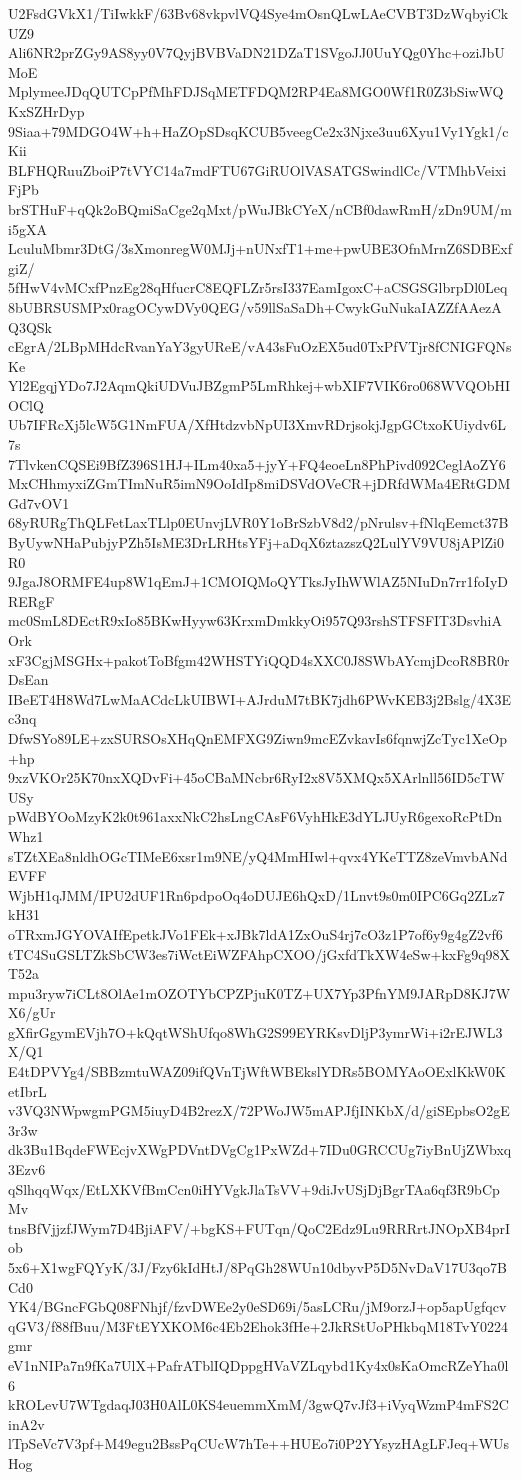 U2FsdGVkX1/TiIwkkF/63Bv68vkpvlVQ4Sye4mOsnQLwLAeCVBT3DzWqbyiCkUZ9
Ali6NR2prZGy9AS8yy0V7QyjBVBVaDN21DZaT1SVgoJJ0UuYQg0Yhc+oziJbUMoE
MplymeeJDqQUTCpPfMhFDJSqMETFDQM2RP4Ea8MGO0Wf1R0Z3bSiwWQKxSZHrDyp
9Siaa+79MDGO4W+h+HaZOpSDsqKCUB5veegCe2x3Njxe3uu6Xyu1Vy1Ygk1/cKii
BLFHQRuuZboiP7tVYC14a7mdFTU67GiRUOlVASATGSwindlCc/VTMhbVeixiFjPb
brSTHuF+qQk2oBQmiSaCge2qMxt/pWuJBkCYeX/nCBf0dawRmH/zDn9UM/mi5gXA
LculuMbmr3DtG/3sXmonregW0MJj+nUNxfT1+me+pwUBE3OfnMrnZ6SDBExfgiZ/
5fHwV4vMCxfPnzEg28qHfucrC8EQFLZr5rsI337EamIgoxC+aCSGSGlbrpDl0Leq
8bUBRSUSMPx0ragOCywDVy0QEG/v59llSaSaDh+CwykGuNukaIAZZfAAezAQ3QSk
cEgrA/2LBpMHdcRvanYaY3gyUReE/vA43sFuOzEX5ud0TxPfVTjr8fCNIGFQNsKe
Yl2EgqjYDo7J2AqmQkiUDVuJBZgmP5LmRhkej+wbXIF7VIK6ro068WVQObHIOClQ
Ub7IFRcXj5lcW5G1NmFUA/XfHtdzvbNpUI3XmvRDrjsokjJgpGCtxoKUiydv6L7s
7TlvkenCQSEi9BfZ396S1HJ+ILm40xa5+jyY+FQ4eoeLn8PhPivd092CeglAoZY6
MxCHhmyxiZGmTImNuR5imN9OoIdIp8miDSVdOVeCR+jDRfdWMa4ERtGDMGd7vOV1
68yRURgThQLFetLaxTLlp0EUnvjLVR0Y1oBrSzbV8d2/pNrulsv+fNlqEemct37B
ByUywNHaPubjyPZh5IsME3DrLRHtsYFj+aDqX6ztazszQ2LulYV9VU8jAPlZi0R0
9JgaJ8ORMFE4up8W1qEmJ+1CMOIQMoQYTksJyIhWWlAZ5NIuDn7rr1foIyDRERgF
mc0SmL8DEctR9xIo85BKwHyyw63KrxmDmkkyOi957Q93rshSTFSFIT3DsvhiAOrk
xF3CgjMSGHx+pakotToBfgm42WHSTYiQQD4sXXC0J8SWbAYcmjDcoR8BR0rDsEan
IBeET4H8Wd7LwMaACdcLkUIBWI+AJrduM7tBK7jdh6PWvKEB3j2Bslg/4X3Ec3nq
DfwSYo89LE+zxSURSOsXHqQnEMFXG9Ziwn9mcEZvkavIs6fqnwjZcTyc1XeOp+hp
9xzVKOr25K70nxXQDvFi+45oCBaMNcbr6RyI2x8V5XMQx5XArlnll56ID5cTWUSy
pWdBYOoMzyK2k0t961axxNkC2hsLngCAsF6VyhHkE3dYLJUyR6gexoRcPtDnWhz1
sTZtXEa8nldhOGcTIMeE6xsr1m9NE/yQ4MmHIwl+qvx4YKeTTZ8zeVmvbANdEVFF
WjbH1qJMM/IPU2dUF1Rn6pdpoOq4oDUJE6hQxD/1Lnvt9s0m0IPC6Gq2ZLz7kH31
oTRxmJGYOVAIfEpetkJVo1FEk+xJBk7ldA1ZxOuS4rj7cO3z1P7of6y9g4gZ2vf6
tTC4SuGSLTZkSbCW3es7iWctEiWZFAhpCXOO/jGxfdTkXW4eSw+kxFg9q98XT52a
mpu3ryw7iCLt8OlAe1mOZOTYbCPZPjuK0TZ+UX7Yp3PfnYM9JARpD8KJ7WX6/gUr
gXfirGgymEVjh7O+kQqtWShUfqo8WhG2S99EYRKsvDljP3ymrWi+i2rEJWL3X/Q1
E4tDPVYg4/SBBzmtuWAZ09ifQVnTjWftWBEkslYDRs5BOMYAoOExlKkW0KetIbrL
v3VQ3NWpwgmPGM5iuyD4B2rezX/72PWoJW5mAPJfjINKbX/d/giSEpbsO2gE3r3w
dk3Bu1BqdeFWEcjvXWgPDVntDVgCg1PxWZd+7IDu0GRCCUg7iyBnUjZWbxq3Ezv6
qSlhqqWqx/EtLXKVfBmCcn0iHYVgkJlaTsVV+9diJvUSjDjBgrTAa6qf3R9bCpMv
tnsBfVjjzfJWym7D4BjiAFV/+bgKS+FUTqn/QoC2Edz9Lu9RRRrtJNOpXB4prIob
5x6+X1wgFQYyK/3J/Fzy6kIdHtJ/8PqGh28WUn10dbyvP5D5NvDaV17U3qo7BCd0
YK4/BGncFGbQ08FNhjf/fzvDWEe2y0eSD69i/5asLCRu/jM9orzJ+op5apUgfqcv
qGV3/f88fBuu/M3FtEYXKOM6c4Eb2Ehok3fHe+2JkRStUoPHkbqM18TvY0224gmr
eV1nNIPa7n9fKa7UlX+PafrATblIQDppgHVaVZLqybd1Ky4x0sKaOmcRZeYha0l6
kROLevU7WTgdaqJ03H0AlL0KS4euemmXmM/3gwQ7vJf3+iVyqWzmP4mFS2CinA2v
lTpSeVc7V3pf+M49egu2BssPqCUcW7hTe++HUEo7i0P2YYsyzHAgLFJeq+WUsHog
